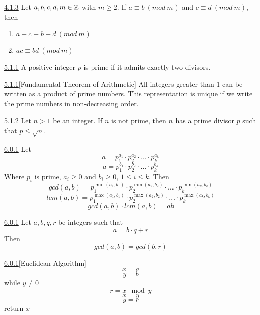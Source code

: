 \documentclass[openany]{report}
\begin{document}
\begin{manualtheorem}{\hyperref[theorem4.1.3]{4.1.3}}
        Let $a,b,c,d,m \in \mathbb{Z}$ with $m \geq 2$. If $a \equiv b \ (mod \ m)$ and $c \equiv d \ (mod \ m)$, then 
    \begin{enumerate}
        \item $a + c \equiv b + d \ (mod \ m)$
        \item $ac \equiv bd \ (mod \ m)$
    \end{enumerate}
\end{manualtheorem}

\begin{manualdefinition}{\hyperref[definition5.1.1]{5.1.1}}
        A positive integer $p$ is prime if it admits exactly two divisors.
\end{manualdefinition}

\begin{manualtheorem}{\hyperref[theorem5.1.1]{5.1.1}}[Fundamental Theorem of Arithmetic]
      All integers greater than 1 can be written as a product of prime numbers. This representation is unique if we write the prime numbers in non-decreasing order.
\end{manualtheorem}

\begin{manualtheorem}{\hyperref[theorem5.1.2]{5.1.2}}
     Let $n > 1$ be an integer. If $n$ is not prime, then $n$ has a prime divisor $p$ such that $p \leq \sqrt{n}$.
\end{manualtheorem}

\begin{manualcorollary}{\hyperref[corollary6.0.1]{6.0.1}}
    Let 
    $$a = p_1^{a_1} \cdot p_2^{a_2} \cdot \ldots \cdot p_k^{a_k}$$
    $$a = p_1^{b_1} \cdot p_2^{b_2} \cdot \ldots \cdot p_k^{b_k}$$
    Where $p_i$ is prime, $a_i \geq 0$ and $b_i \geq 0$, $1 \leq i \leq k$. Then 
    $$gcd(a,b) = p_1^{\min(a_1,b_1)} \cdot p_2^{\min(a_2,b_2)} \cdot \ldots \cdot p_k^{\min(a_k,b_k)}$$
    $$lcm(a,b) = p_1^{\max(a_1,b_1)} \cdot p_2^{\max(a_2,b_2)} \cdot \ldots \cdot p_k^{\max(a_k,b_k)}$$
    $$gcd(a,b) \cdot lcm(a,b) = ab$$
\end{manualcorollary}


\begin{manuallemma}{\hyperref[lemma6.0.1]{6.0.1}}
Let $a,b,q,r$ be integers such that 
    $$a = b\cdot q + r$$
    Then 
    $$gcd(a,b)=gcd(b,r)$$
\end{manuallemma}

\begin{manualdefinition}{\hyperref[definition6.0.1]{6.0.1}}[Euclidean Algorithm]
     $$x = a$$
    $$y = b$$
    while $y \neq 0$
    $$r = x \mod y$$
    $$x = y$$
    $$y = r$$
    return $x$
\end{manualdefinition}
\end{document}
